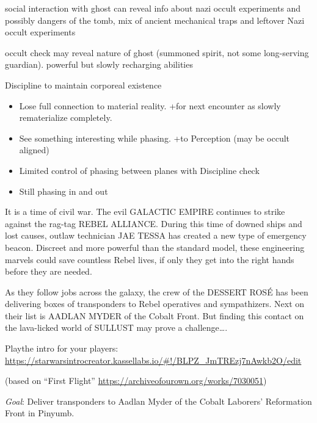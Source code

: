 \documentclass[background]{book}
\newcommand{\df}{\DifficultyDie}
\newcommand{\stb}{\SetbackDie}
\newcommand{\ch}{\ChallengeDie}
\newcommand{\bbb}{\BoostDie}
\begin{document}
\begin{multicols}{2}
social interaction with ghost can reveal info about nazi occult experiments and possibly dangers of the tomb, mix of ancient mechanical traps and leftover Nazi occult experiments

    occult check may reveal nature of ghost (summoned spirit, not some long-serving guardian).  powerful but slowly recharging abilities

\ch\df Discipline to maintain corporeal existence
    \begin{itemize}
        \item \Failure Lose full connection to material reality.  +\stb for next encounter as slowly rematerialize completely.
        \item \Advantage See something interesting while phasing.  +\bbb to Perception (may be occult aligned)
        \item \Triumph Limited control of phasing between planes with \df\df\df Discipline check
        \item \Despair Still phasing in and out
    \end{itemize}

It is a time of civil war. The evil GALACTIC EMPIRE continues to strike against the rag-tag REBEL ALLIANCE. During this time of downed ships and lost causes, outlaw technician JAE TESSA has created a new type of emergency beacon. Discreet and more powerful than the standard model, these engineering marvels could save countless Rebel lives, if only they get into the right hands before they are needed.

As they follow jobs across the galaxy, the crew of the DESSERT ROSÉ has been delivering boxes of transponders to Rebel operatives and sympathizers. Next on their list is AADLAN MYDER of the Cobalt Front. But finding this contact on the lava-licked world of SULLUST may prove a challenge….

Playthe intro for your players: \url{https://starwarsintrocreator.kassellabs.io/#!/BLPZ_JmTREzj7nAwkb2O/edit}

(based on ``First Flight'' \url{https://archiveofourown.org/works/7030051})

\emph{Goal}: Deliver transponders to Aadlan Myder of the Cobalt Laborers’ Reformation Front in Pinyumb.\\


\end{multicols}
\end{document}
